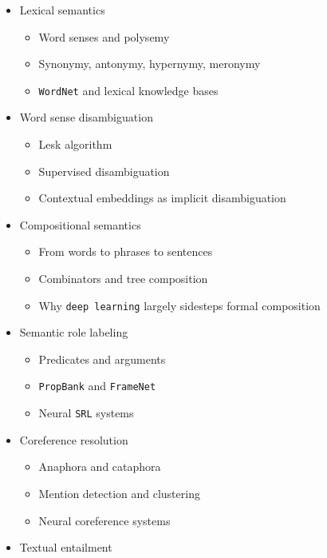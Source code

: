 \documentclass[
]{article}
\providecommand{\tightlist}{%
  \setlength{\itemsep}{0pt}\setlength{\parskip}{0pt}}
\begin{document}
\begin{itemize}
  \begin{itemize}
  \tightlist
  \item
    Lexical semantics

    \begin{itemize}
    \tightlist
    \item
      Word senses and polysemy
    \item
      Synonymy, antonymy, hypernymy, meronymy
    \item
      \texttt{WordNet} and lexical knowledge bases
    \end{itemize}
  \item
    Word sense disambiguation

    \begin{itemize}
    \tightlist
    \item
      Lesk algorithm
    \item
      Supervised disambiguation
    \item
      Contextual embeddings as implicit disambiguation
    \end{itemize}
  \item
    Compositional semantics

    \begin{itemize}
    \tightlist
    \item
      From words to phrases to sentences
    \item
      Combinators and tree composition
    \item
      Why \texttt{deep\ learning} largely sidesteps formal composition
    \end{itemize}
  \item
    Semantic role labeling

    \begin{itemize}
    \tightlist
    \item
      Predicates and arguments
    \item
      \texttt{PropBank} and \texttt{FrameNet}
    \item
      Neural \texttt{SRL} systems
    \end{itemize}
  \item
    Coreference resolution

    \begin{itemize}
    \tightlist
    \item
      Anaphora and cataphora
    \item
      Mention detection and clustering
    \item
      Neural coreference systems
    \end{itemize}
  \item
    Textual entailment


\end{itemize}
\end{itemize}
\end{document}
